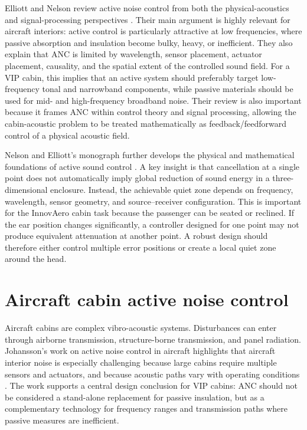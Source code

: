 Elliott and Nelson review active noise control from both the physical-acoustics and signal-processing perspectives \cite{elliott1993active}. Their main argument is highly relevant for aircraft interiors: active control is particularly attractive at low frequencies, where passive absorption and insulation become bulky, heavy, or inefficient. They also explain that ANC is limited by wavelength, sensor placement, actuator placement, causality, and the spatial extent of the controlled sound field. For a VIP cabin, this implies that an active system should preferably target low-frequency tonal and narrowband components, while passive materials should be used for mid- and high-frequency broadband noise. Their review is also important because it frames ANC within control theory and signal processing, allowing the cabin-acoustic problem to be treated mathematically as feedback/feedforward control of a physical acoustic field.

Nelson and Elliott's monograph further develops the physical and mathematical foundations of active sound control \cite{nelson1992active}. A key insight is that cancellation at a single point does not automatically imply global reduction of sound energy in a three-dimensional enclosure. Instead, the achievable quiet zone depends on frequency, wavelength, sensor geometry, and source--receiver configuration. This is important for the InnovAero cabin task because the passenger can be seated or reclined. If the ear position changes significantly, a controller designed for one point may not produce equivalent attenuation at another point. A robust design should therefore either control multiple error positions or create a local quiet zone around the head.

\section{Aircraft cabin active noise control}
\label{sec:aircraft-cabin-anc}

Aircraft cabins are complex vibro-acoustic systems. Disturbances can enter through airborne transmission, structure-borne transmission, and panel radiation. Johansson's work on active noise control in aircraft highlights that aircraft interior noise is especially challenging because large cabins require multiple sensors and actuators, and because acoustic paths vary with operating conditions \cite{johansson2015active}. The work supports a central design conclusion for VIP cabins: ANC should not be considered a stand-alone replacement for passive insulation, but as a complementary technology for frequency ranges and transmission paths where passive measures are inefficient.

